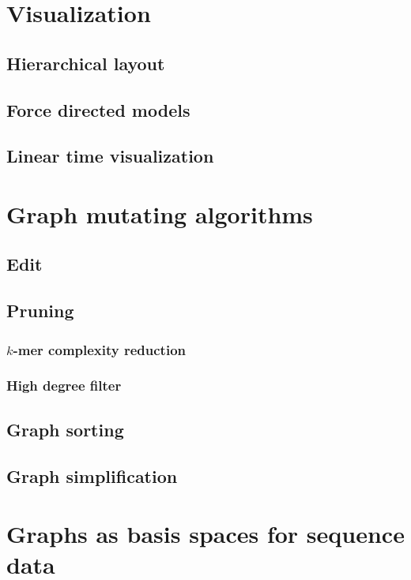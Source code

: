 \section{Visualization}

\subsection{Hierarchical layout}

\subsection{Force directed models}

\subsection{Linear time visualization}


\section{Graph mutating algorithms}

\subsection{Edit}

\subsection{Pruning}
\subsubsection{$k$-mer complexity reduction}
\subsubsection{High degree filter}

\subsection{Graph sorting}

\subsection{Graph simplification}


\section{Graphs as basis spaces for sequence data}


